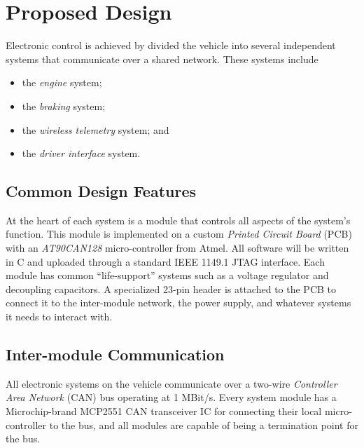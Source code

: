 %
%
%
%

\chapter{Proposed Design}
\label{ch:proposed_design}

Electronic control is achieved by divided the vehicle into several independent systems that communicate over a shared network. These systems include

\begin{itemize}
\item the \emph{engine} system;
\item the \emph{braking} system;
\item the \emph{wireless telemetry} system; and
\item the \emph{driver interface} system.
\end{itemize}

\section{Common Design Features}
\label{sec:common_design_features}


At the heart of each system is a module that controls all aspects of the system's function. This module is implemented on a custom \emph{Printed Circuit Board} (PCB) with an \emph{AT90CAN128} micro-controller from Atmel. All software will be written in C and uploaded through a standard IEEE 1149.1 JTAG interface. Each module has common {}``life-support'' systems such as a voltage regulator and decoupling capacitors. A specialized 23-pin header is attached to the PCB to connect it to the inter-module network, the power supply, and whatever systems it needs to interact with.

\section{Inter-module Communication}
\label{sec:inter_module_communication}


All electronic systems on the vehicle communicate over a two-wire \emph{Controller Area Network} (CAN) bus operating at 1 MBit/s. Every system module has a Microchip-brand MCP2551 CAN transceiver IC for connecting their local micro-controller to the bus, and all modules are capable of being a termination point for the bus.

